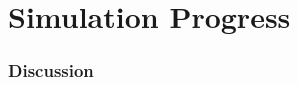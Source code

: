 \section{Simulation Progress}
\label{sec:progress}
\begin{frame}
\frametitle{Discussion}
\end{frame}
